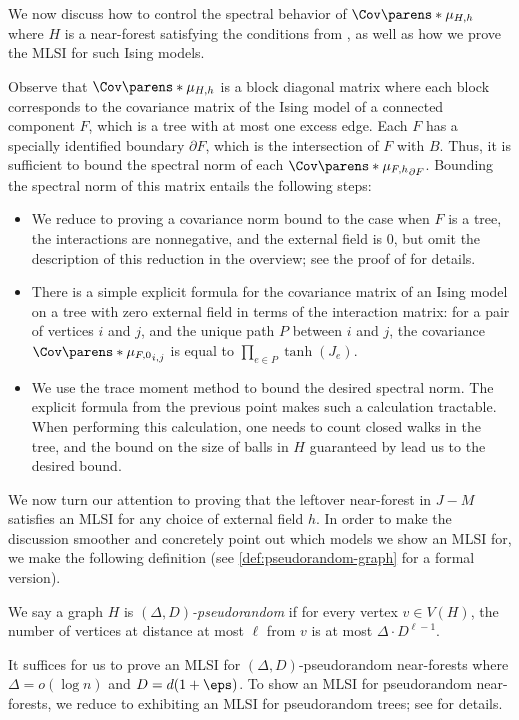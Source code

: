 \documentclass[11pt,letterpaper]{article}
\begin{document}
We now discuss how to control the spectral behavior of $\Cov\parens*{\mu_{H, h}}$ where $H$ is a near-forest satisfying the conditions from , as well as how we prove the MLSI for such Ising models.

Observe that $\Cov\parens*{\mu_{H,h}}$ is a block diagonal matrix where each block corresponds to the covariance matrix of the Ising model of a connected component $F$, which is a tree with at most one excess edge.
Each $F$ has a specially identified boundary $\partial F$, which is the intersection of $F$ with $B$.
Thus, it is sufficient to bound the spectral norm of each $\Cov\parens*{\mu_{F, h}}_{\partial F}$.
Bounding the spectral norm of this matrix entails the following steps:
\begin{itemize}
    \item We reduce to proving a covariance norm bound to the case when $F$ is a tree, the interactions are nonnegative, and the external field is $0$, but omit the description of this reduction in the overview; see the proof of  for details.
    \item There is a simple explicit formula for the covariance matrix of an Ising model on a tree with zero external field in terms of the interaction matrix: for a pair of vertices $i$ and $j$, and the unique path $P$ between $i$ and $j$, the covariance $\Cov\parens*{\mu_{F,0}}_{i,j}$ is equal to $\prod_{e\in P}\tanh(J_e)$.
    \item We use the trace moment method to bound the desired spectral norm.
    The explicit formula from the previous point makes such a calculation tractable.
    When performing this calculation, one needs to count closed walks in the tree, and the bound on the size of balls in $H$ guaranteed by  lead us to the desired bound.
\end{itemize}

We now turn our attention to proving that the leftover near-forest in $J-M$ satisfies an MLSI for any choice of external field $h$.
In order to make the discussion smoother and concretely point out which models we show an MLSI for, we make the following definition (see \cref{def:pseudorandom-graph} for a formal version).
\begin{definition}
    We say a graph $H$ is \emph{$(\Delta,D)$-pseudorandom} if for every vertex $v\in V(H)$, the number of vertices at distance at most $\ell$ from $v$ is at most $\Delta\cdot D^{\ell-1}$.
\end{definition}
It suffices for us to prove an MLSI for $(\Delta, D)$-pseudorandom near-forests where $\Delta = o(\log n)$ and $D = d(1+\eps)$.
To show an MLSI for pseudorandom near-forests, we reduce to exhibiting an MLSI for pseudorandom trees; see  for details.
\end{document}
